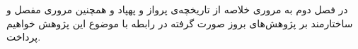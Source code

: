 در فصل دوم به مروری خلاصه از تاریخچه‌ی پرواز و پهپاد و همچنین مروری مفصل و ساختارمند بر پژوهش‌های بروز صورت گرفته در رابطه با موضوع این پژوهش خواهیم پرداخت.